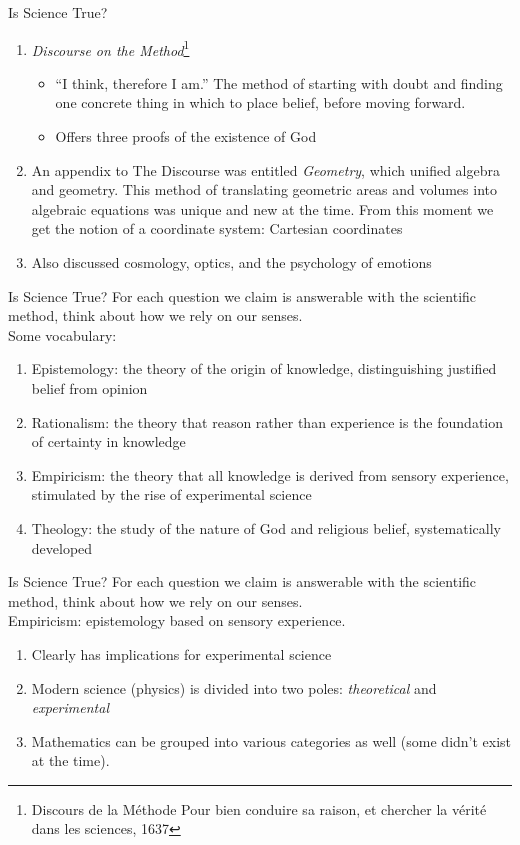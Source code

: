\documentclass{beamer}
\begin{document}
\begin{frame}{Is Science True?}
\small
\begin{enumerate}
\item \textit{Discourse on the Method}\footnote{Discours de la Méthode Pour bien conduire sa raison, et chercher la vérité dans les sciences, 1637}
\begin{itemize}
\item ``I think, therefore I am.''  The method of starting with doubt and finding one concrete thing in which to place belief, before moving forward.
\item Offers three proofs of the existence of God
\end{itemize}
\item An appendix to The Discourse was entitled \textit{Geometry}, which unified algebra and geometry.  This method of translating geometric areas and volumes into algebraic equations was unique and new at the time.  From this moment we get the notion of a coordinate system: Cartesian coordinates
\item Also discussed cosmology, optics, and the psychology of emotions
\end{enumerate}
\end{frame}

\begin{frame}{Is Science True?}
For each question we claim is answerable with the scientific method, think about how we rely on our senses. \\ \vspace{0.5cm}
Some vocabulary:
\begin{enumerate}
\item Epistemology: the theory of the origin of knowledge, distinguishing justified belief from opinion
\item Rationalism: the theory that reason rather than experience is the foundation of certainty in knowledge
\item Empiricism: the theory that all knowledge is derived from sensory experience, stimulated by the rise of experimental science
\item Theology: the study of the nature of God and religious belief, systematically developed
\end{enumerate}
\end{frame}

\begin{frame}{Is Science True?}
For each question we claim is answerable with the scientific method, think about how we rely on our senses. \\ \vspace{0.5cm}
Empiricism: epistemology based on sensory experience.
\begin{enumerate}
\item Clearly has implications for experimental science
\item Modern science (physics) is divided into two poles: \textit{theoretical} and \textit{experimental}
\item Mathematics can be grouped into various categories as well (some didn't exist at the time).
\end{enumerate}
\end{frame}
\end{document}
